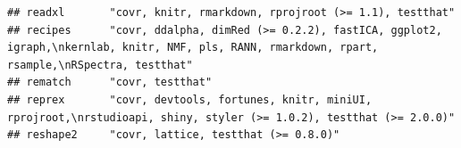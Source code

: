 \documentclass[]{article}
\begin{document}
\begin{verbatim}
## readxl       "covr, knitr, rmarkdown, rprojroot (>= 1.1), testthat"                                                                                                                                                                                                                                                                                                                                                                                                                                                                                                                                    
## recipes      "covr, ddalpha, dimRed (>= 0.2.2), fastICA, ggplot2, igraph,\nkernlab, knitr, NMF, pls, RANN, rmarkdown, rpart, rsample,\nRSpectra, testthat"                                                                                                                                                                                                                                                                                                                                                                                                                                             
## rematch      "covr, testthat"                                                                                                                                                                                                                                                                                                                                                                                                                                                                                                                                                                          
## reprex       "covr, devtools, fortunes, knitr, miniUI, rprojroot,\nrstudioapi, shiny, styler (>= 1.0.2), testthat (>= 2.0.0)"                                                                                                                                                                                                                                                                                                                                                                                                                                                                          
## reshape2     "covr, lattice, testthat (>= 0.8.0)"                                                                                                                                                                                                                                                                                                                                                                                                                                                                                                                                                      

\end{verbatim}
\end{document}
